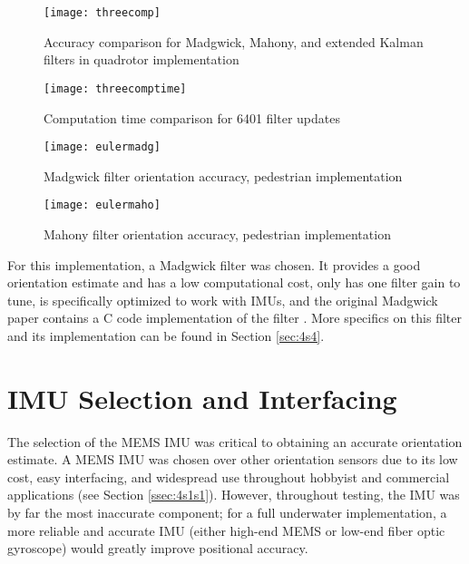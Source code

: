 \documentclass[11pt]{ucthesisCP}
\begin{document}
\begin{figure}[htbp]
	\centering
	\texttt{[image: threecomp]}
	\caption{Accuracy comparison for Madgwick, Mahony, and extended Kalman filters in quadrotor implementation \cite{ekfmadmah}}
	\label{fig:threecomp}
\end{figure}

\begin{figure}[htbp]
	\centering
	\texttt{[image: threecomptime]}
	\caption{Computation time comparison for 6401 filter updates \cite{ekfmadmah}}
	\label{fig:threecomptime}
\end{figure}

\begin{figure}[htbp]
	\centering
	\texttt{[image: eulermadg]}
	\caption{Madgwick filter orientation accuracy, pedestrian implementation \cite{sfcomp}}
	\label{fig:eulermadg}
\end{figure}

\begin{figure}[htbp]
	\centering
	\texttt{[image: eulermaho]}
	\caption{Mahony filter orientation accuracy, pedestrian implementation  \cite{sfcomp}}
	\label{fig:eulermaho}
\end{figure}

For this implementation, a Madgwick filter was chosen. It provides a good orientation estimate and has a low computational cost, only has one filter gain to tune, is specifically optimized to work with IMUs, and the original Madgwick paper contains a C code implementation of the filter \cite{madgwick}. More specifics on this filter and its implementation can be found in Section \ref{sec:4s4}.

\section{IMU Selection and Interfacing} \label{sec:4s2}
The selection of the MEMS IMU was critical to obtaining an accurate orientation estimate. A MEMS IMU was chosen over other orientation sensors due to its low cost, easy interfacing, and widespread use throughout hobbyist and commercial applications (see Section \ref{ssec:4s1s1}). However, throughout testing, the IMU was by far the most inaccurate component; for a full underwater implementation, a more reliable and accurate IMU (either high-end MEMS or low-end fiber optic gyroscope) would greatly improve positional accuracy. 
\end{document}
